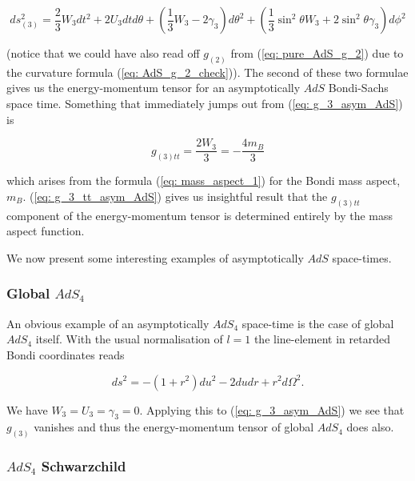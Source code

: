 \documentclass[a4paper,11pt]{article}
\numberwithin{equation}{section}
\begin{document}
\begin{equation} \label{eq: g_3_asym_AdS}
ds_{(3)}^2=\frac{2}{3}W_{3} dt^2 + 2U_{3} dt d\theta +\left(\frac{1}{3} W_3 - 2\gamma_{3}\right) d\theta^2+\left( \frac{1}{3}\sin^2 \theta W_{3} +2\sin^2 \theta \gamma_{3} \right) d\phi^2
\end{equation}

\noindent (notice that we could have also read off $g_{(2)}$ from (\ref{eq: pure_AdS_g_2}) due to the curvature formula (\ref{eq: AdS_g_2_check})). The second of these two formulae gives us the energy-momentum tensor for an asymptotically $AdS$ Bondi-Sachs space time. Something that immediately jumps out from (\ref{eq: g_3_asym_AdS}) is 

\begin{equation} \label{eq: g_3_tt_asym_AdS}
g_{(3)tt}=\frac{2W_{3}}{3} = -\frac{4m_B}{3}
\end{equation}

\noindent which arises from the formula (\ref{eq: mass_aspect_1}) for the Bondi mass aspect, $m_B$. (\ref{eq: g_3_tt_asym_AdS}) gives us  insightful result that the $g_{(3)tt}$ component of the energy-momentum tensor is determined entirely by the mass aspect function. \par

We now present some interesting examples of asymptotically $AdS$ space-times. \par

\subsubsection{Global $AdS_4$}

An obvious example of an asymptotically $AdS_4$ space-time is the case of global $AdS_4$ itself. With the usual normalisation of $l=1$ the line-element in retarded Bondi coordinates reads 

\begin{equation}
ds^2=-(1+r^2)du^2-2du dr+r^2d\Omega^2.
\end{equation}

We have $W_{3}=U_{3}=\gamma_{3}=0$. Applying this to (\ref{eq: g_3_asym_AdS}) we see that $g_{(3)}$ vanishes
and thus the energy-momentum tensor of global $AdS_{4}$ does also.

\subsubsection{$AdS_{4}$ Schwarzchild}  
\end{document}
